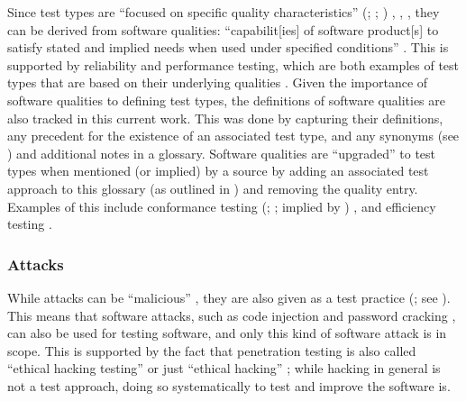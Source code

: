    Since test types are ``focused on specific quality characteristics''
    \ifnotpaper
        (\citealp[p.~15]{IEEE2022}; \citeyear[p.~7]{IEEE2021};
        \citeyear[p.~473]{IEEE2017})%
    \else
        \cite[p.~15]{IEEE2022}, \cite[p.~7]{IEEE2021}, \cite[p.~473]{IEEE2017}%
    \fi, they can be derived from software qualities: ``capabilit[ies] of
    software product[s] to satisfy stated and implied needs when used under
    specified conditions'' \citep[p.~424]{IEEE2017}. This
    is supported by reliability and performance testing, which are both examples of
    test types \citep{IEEE2022, IEEE2021} that are based on their underlying
    qualities \citep[p.~18]{FentonAndPfleeger1997}.
    Given the importance of software qualities to defining test types, the
    definitions of \qualityCount{} software qualities are also tracked in this
    current work. This was done by capturing their
    definitions, any precedent for the existence of an associated test type,
    and any synonyms (see ) and additional notes in a glossary.
    Software qualities are ``upgraded'' to test types when mentioned (or
    implied) by a source by adding an associated test approach to this glossary
    (as outlined in ) and removing the quality entry. Examples
    of this include conformance testing
    \ifnotpaper
        (\citealp[p.~5-7]{SWEBOK2024}; \citealp[p.~25]{JardEtAl1999}; implied
        by \citealp[p.~93]{IEEE2017})
    \else
        \cite[p.~5-7]{SWEBOK2024}, \cite[p.~25]{JardEtAl1999}
    \fi and efficiency testing \citep[p.~44]{Kam2008}.

    \subsubsection{Attacks}
    \label{attacks}
    While attacks can be ``malicious'' \citep[p.~7]{IEEE2017}, they are also
    given as a test practice (\citeyear[p.~34]{IEEE2022}; see ).
    This means that software attacks, such as code injection and password
    cracking \citepISTQB{}, can also be used for testing software, and only
    this kind of software attack is in scope. This is supported by the fact
    that penetration testing is also called ``ethical hacking testing''
    \citep[p.~13-4]{SWEBOK2024} or just ``ethical hacking''
    \citep[p.~28]{Gerrard2000b}; while hacking in general is not a test
    approach, doing so systematically to test and improve the software is.


